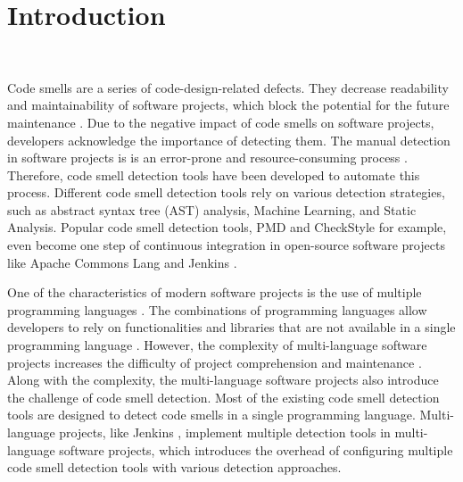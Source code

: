 \section{Introduction}~\label{sec:introduction}


Code smells are a series of code-design-related defects.
They decrease readability \cite{5741260} and maintainability
\cite{6392174,6405287} of software projects, which block the potential for the
future maintenance \cite{Fowler_Beck}.
Due to the negative impact of code smells on software projects, developers
acknowledge the importance of detecting them.
The manual detection in software projects is is an error-prone and
resource-consuming process \cite{DetectingDefectsInObject}.
Therefore, code smell detection tools have been developed to automate this
process.
Different code smell detection tools rely on various detection strategies, such
as abstract syntax tree (AST) analysis, Machine Learning, and Static Analysis.
Popular code smell detection tools, PMD \cite{PMD} and CheckStyle
\cite{CheckStyle} for example, even become one step of continuous integration
in open-source software projects like Apache Commons Lang
\cite{ApacheCommonsLang} and Jenkins \cite{Jekins}.

One of the characteristics of modern software projects is the use of multiple
programming languages \cite{723183}.
The combinations of programming languages allow developers to rely on
functionalities and libraries that are not available in a single programming
language \cite{7476675}.
However, the complexity of multi-language software projects increases the
difficulty of project comprehension and maintenance \cite{7476675,
10.1109/SCAM.2012.11, 7396422}.
Along with the complexity, the multi-language software projects also introduce
the challenge of code smell detection.
Most of the existing code smell detection tools are designed to detect code
smells in a single programming language.
Multi-language projects, like Jenkins \cite{Jekins}, implement multiple
detection tools in multi-language software projects, which introduces the
overhead of configuring multiple code smell detection tools with various
detection approaches.

